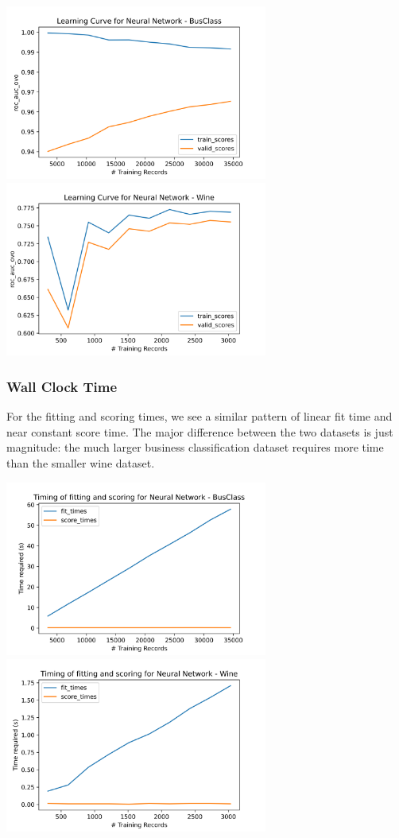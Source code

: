 \documentclass[
	letterpaper, %
]{jdf}
\begin{document}
\includegraphics[width=3.4in]{Figures/BusClass-0920/NN/learn_curve.png}
\includegraphics[width=3.4in]{Figures/Wine-0921/NN/learn_curve.png}

\subsubsection{Wall Clock Time}
For the fitting and scoring times, we see a similar pattern of linear fit time and near constant score time. The major difference between the two datasets is just magnitude: the much larger business classification dataset requires more time than the smaller wine dataset.

\includegraphics[width=3.4in]{Figures/BusClass-0920/NN/time_curve.png}
\includegraphics[width=3.4in]{Figures/Wine-0921/NN/time_curve.png}
\end{document}
